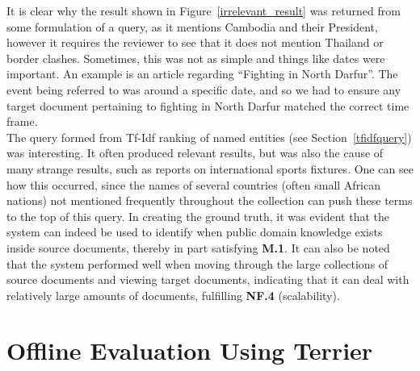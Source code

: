 \documentclass{l4proj}
\begin{document}
It is clear why the result shown in Figure~\ref{irrelevant_result} was returned from some formulation of a query, as it mentions Cambodia and their President, however it requires the reviewer to see that it does not mention Thailand or border clashes. Sometimes, this was not as simple and things like dates were important. An example is an article regarding ``Fighting in North Darfur''. The event being referred to was around a specific date, and so we had to ensure any target document pertaining to fighting in North Darfur matched the correct time frame. \\
The query formed from Tf-Idf ranking of named entities (see Section~\ref{tfidfquery}) was interesting. It often produced relevant results, but was also the cause of many strange results, such as reports on international sports fixtures. One can see how this occurred, since the names of several countries (often small African nations) not mentioned frequently throughout the collection can push these terms to the top of this query.
In creating the ground truth, it was evident that the system can indeed be used to identify when public domain knowledge exists inside source documents, thereby in part satisfying \textbf{M.1}. It can also be noted that the system performed well when moving through the large collections of source documents and viewing target documents, indicating that it can deal with relatively large amounts of documents, fulfilling \textbf{NF.4} (scalability).

\section{Offline Evaluation Using Terrier}\label{offlineevaluation}
\end{document}
